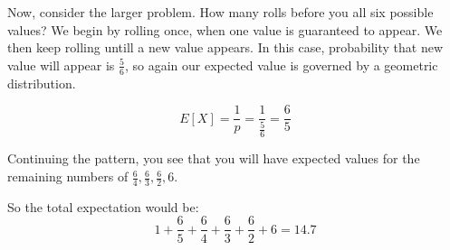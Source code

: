 \documentclass[12pt]{article}
\begin{document}
Now, consider the larger problem. How many rolls before you all six possible values? 
We begin by rolling once, when one value is guaranteed to appear. We then keep 
rolling untill a new value appears. In this case, probability that new value 
will appear is $\frac{5}{6}$, so again our expected value is governed by a
geometric distribution. 

   \begin{equation}
        E[X] =\frac{1}{p} = \frac{1}{\frac{5}{6}} = \frac{6}{5}
   \end{equation}
   
Continuing the pattern, you see that you will have expected values for the 
remaining numbers of $\frac{6}{4},\frac{6}{3},\frac{6}{2},6$. 

So the total expectation would be: 
\begin{equation}
    1+\frac{6}{5}+\frac{6}{4}+\frac{6}{3}+\frac{6}{2}+6=14.7
\end{equation}	
\end{document}
